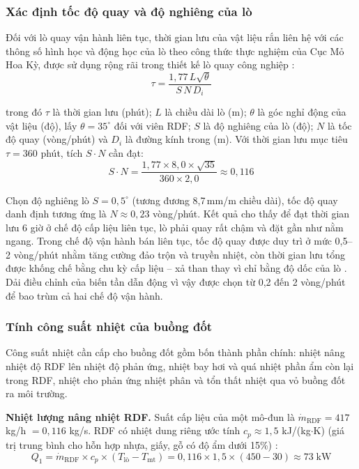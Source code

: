 \documentclass[../main.tex]{subfiles}
\begin{document}
\subsubsection{Xác định tốc độ quay và độ nghiêng của lò}

Đối với lò quay vận hành liên tục, thời gian lưu của vật liệu rắn liên hệ với các thông số hình học và động học của lò theo công thức thực nghiệm của Cục Mỏ Hoa Kỳ, được sử dụng rộng rãi trong thiết kế lò quay công nghiệp \cite{Boateng2008}:
\begin{equation}
\tau = \frac{1{,}77 \, L \sqrt{\theta}}{S \, N \, D_i}
\label{eq:thoi-gian-luu-lo-quay}
\end{equation}

trong đó $\tau$ là thời gian lưu (phút); $L$ là chiều dài lò (m); $\theta$ là góc nghỉ động của vật liệu (độ), lấy $\theta = 35^\circ$ đối với viên RDF; $S$ là độ nghiêng của lò (độ); $N$ là tốc độ quay (vòng/phút) và $D_i$ là đường kính trong (m). Với thời gian lưu mục tiêu $\tau = 360$ phút, tích $S \cdot N$ cần đạt:
\begin{equation}
S \cdot N = \frac{1{,}77 \times 8{,}0 \times \sqrt{35}}{360 \times 2{,}0} \approx 0{,}116
\end{equation}

Chọn độ nghiêng lò $S = 0{,}5^\circ$ (tương đương 8,7\,mm/m chiều dài), tốc độ quay danh định tương ứng là $N \approx 0{,}23$ vòng/phút. Kết quả cho thấy để đạt thời gian lưu 6 giờ ở chế độ cấp liệu liên tục, lò phải quay rất chậm và đặt gần như nằm ngang. Trong chế độ vận hành bán liên tục, tốc độ quay được duy trì ở mức 0,5--2 vòng/phút nhằm tăng cường đảo trộn và truyền nhiệt, còn thời gian lưu tổng được khống chế bằng chu kỳ cấp liệu -- xả than thay vì chỉ bằng độ dốc của lò \cite{Boateng2008}. Dải điều chỉnh của biến tần dẫn động vì vậy được chọn từ 0,2 đến 2 vòng/phút để bao trùm cả hai chế độ vận hành.

\subsubsection{Tính công suất nhiệt của buồng đốt}

Công suất nhiệt cần cấp cho buồng đốt gồm bốn thành phần chính: nhiệt nâng nhiệt độ RDF lên nhiệt độ phản ứng, nhiệt bay hơi và quá nhiệt phần ẩm còn lại trong RDF, nhiệt cho phản ứng nhiệt phân và tổn thất nhiệt qua vỏ buồng đốt ra môi trường.

\textbf{Nhiệt lượng nâng nhiệt RDF.} Suất cấp liệu của một mô-đun là $\dot{m}_{\text{RDF}} = 417$ kg/h $= 0{,}116$ kg/s. RDF có nhiệt dung riêng ước tính $c_p \approx 1{,}5$ kJ/(kg$\cdot$K) (giá trị trung bình cho hỗn hợp nhựa, giấy, gỗ có độ ẩm dưới 15\%) \cite{Basu2013}:
\begin{equation}
Q_1 = \dot{m}_{\text{RDF}} \times c_p \times (T_{\text{lò}} - T_{\text{mt}})
= 0{,}116 \times 1{,}5 \times (450 - 30) \approx 73\;\text{kW}
\label{eq:Q1-nang-nhiet}
\end{equation}
\end{document}
